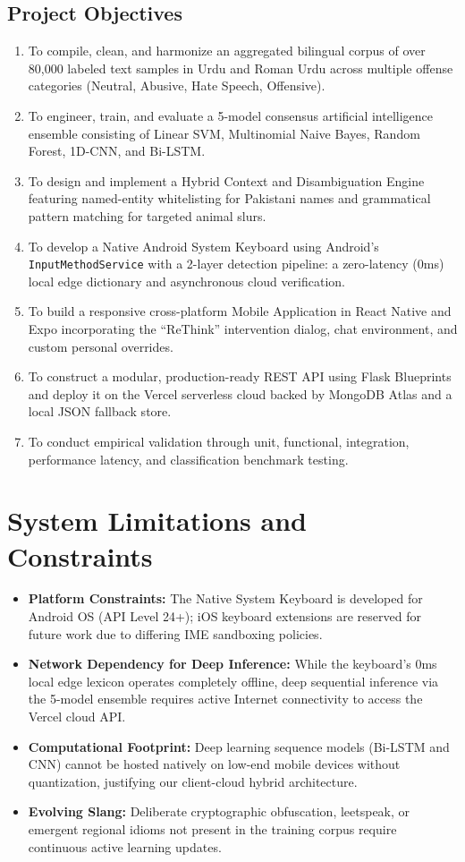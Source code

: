 \documentclass[A4paper,12pt]{report}
\theoremstyle{plain}
\theoremstyle{definition}
\theoremstyle{remark}
\numberwithin{equation}{section}
\begin{document}
\subsection{Project Objectives}
\begin{enumerate}[leftmargin=*]
    \item To compile, clean, and harmonize an aggregated bilingual corpus of over 80,000 labeled text samples in Urdu and Roman Urdu across multiple offense categories (Neutral, Abusive, Hate Speech, Offensive).
    \item To engineer, train, and evaluate a 5-model consensus artificial intelligence ensemble consisting of Linear SVM, Multinomial Naive Bayes, Random Forest, 1D-CNN, and Bi-LSTM.
    \item To design and implement a Hybrid Context and Disambiguation Engine featuring named-entity whitelisting for Pakistani names and grammatical pattern matching for targeted animal slurs.
    \item To develop a Native Android System Keyboard using Android's \texttt{InputMethodService} with a 2-layer detection pipeline: a zero-latency (0ms) local edge dictionary and asynchronous cloud verification.
    \item To build a responsive cross-platform Mobile Application in React Native and Expo incorporating the ``ReThink'' intervention dialog, chat environment, and custom personal overrides.
    \item To construct a modular, production-ready REST API using Flask Blueprints and deploy it on the Vercel serverless cloud backed by MongoDB Atlas and a local JSON fallback store.
    \item To conduct empirical validation through unit, functional, integration, performance latency, and classification benchmark testing.
\end{enumerate}

\section{System Limitations and Constraints}
\begin{itemize}[leftmargin=*]
    \item \textbf{Platform Constraints:} The Native System Keyboard is developed for Android OS (API Level 24+); iOS keyboard extensions are reserved for future work due to differing IME sandboxing policies.
    \item \textbf{Network Dependency for Deep Inference:} While the keyboard's 0ms local edge lexicon operates completely offline, deep sequential inference via the 5-model ensemble requires active Internet connectivity to access the Vercel cloud API.
    \item \textbf{Computational Footprint:} Deep learning sequence models (Bi-LSTM and CNN) cannot be hosted natively on low-end mobile devices without quantization, justifying our client-cloud hybrid architecture.
    \item \textbf{Evolving Slang:} Deliberate cryptographic obfuscation, leetspeak, or emergent regional idioms not present in the training corpus require continuous active learning updates.
\end{itemize}
\end{document}
